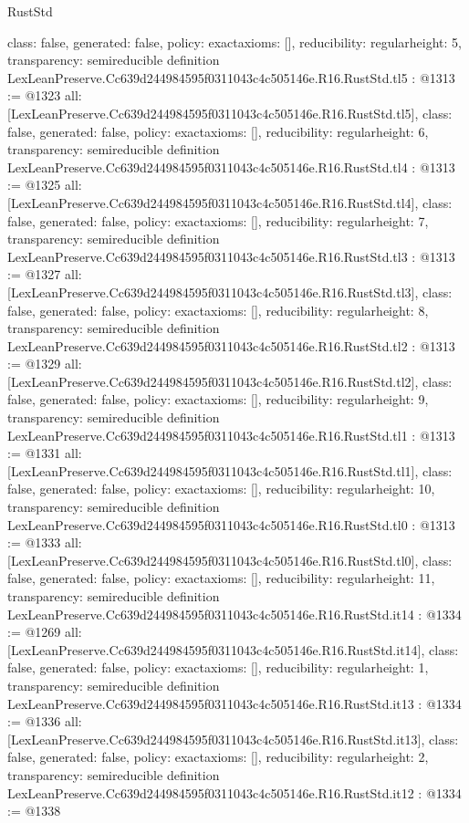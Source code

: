 \begin{lexlean}{RustStd}
\begin{coremodule}
{  class: false,
  generated: false,
  policy: exact{axioms: []},
  reducibility: regular{height: 5},
  transparency: semireducible
}
definition LexLeanPreserve.Cc639d244984595f0311043c4c505146e.R16.RustStd.tl5 : @1313 := @1323 {
  all: [LexLeanPreserve.Cc639d244984595f0311043c4c505146e.R16.RustStd.tl5],
  class: false,
  generated: false,
  policy: exact{axioms: []},
  reducibility: regular{height: 6},
  transparency: semireducible
}
definition LexLeanPreserve.Cc639d244984595f0311043c4c505146e.R16.RustStd.tl4 : @1313 := @1325 {
  all: [LexLeanPreserve.Cc639d244984595f0311043c4c505146e.R16.RustStd.tl4],
  class: false,
  generated: false,
  policy: exact{axioms: []},
  reducibility: regular{height: 7},
  transparency: semireducible
}
definition LexLeanPreserve.Cc639d244984595f0311043c4c505146e.R16.RustStd.tl3 : @1313 := @1327 {
  all: [LexLeanPreserve.Cc639d244984595f0311043c4c505146e.R16.RustStd.tl3],
  class: false,
  generated: false,
  policy: exact{axioms: []},
  reducibility: regular{height: 8},
  transparency: semireducible
}
definition LexLeanPreserve.Cc639d244984595f0311043c4c505146e.R16.RustStd.tl2 : @1313 := @1329 {
  all: [LexLeanPreserve.Cc639d244984595f0311043c4c505146e.R16.RustStd.tl2],
  class: false,
  generated: false,
  policy: exact{axioms: []},
  reducibility: regular{height: 9},
  transparency: semireducible
}
definition LexLeanPreserve.Cc639d244984595f0311043c4c505146e.R16.RustStd.tl1 : @1313 := @1331 {
  all: [LexLeanPreserve.Cc639d244984595f0311043c4c505146e.R16.RustStd.tl1],
  class: false,
  generated: false,
  policy: exact{axioms: []},
  reducibility: regular{height: 10},
  transparency: semireducible
}
definition LexLeanPreserve.Cc639d244984595f0311043c4c505146e.R16.RustStd.tl0 : @1313 := @1333 {
  all: [LexLeanPreserve.Cc639d244984595f0311043c4c505146e.R16.RustStd.tl0],
  class: false,
  generated: false,
  policy: exact{axioms: []},
  reducibility: regular{height: 11},
  transparency: semireducible
}
definition LexLeanPreserve.Cc639d244984595f0311043c4c505146e.R16.RustStd.it14 : @1334 := @1269 {
  all: [LexLeanPreserve.Cc639d244984595f0311043c4c505146e.R16.RustStd.it14],
  class: false,
  generated: false,
  policy: exact{axioms: []},
  reducibility: regular{height: 1},
  transparency: semireducible
}
definition LexLeanPreserve.Cc639d244984595f0311043c4c505146e.R16.RustStd.it13 : @1334 := @1336 {
  all: [LexLeanPreserve.Cc639d244984595f0311043c4c505146e.R16.RustStd.it13],
  class: false,
  generated: false,
  policy: exact{axioms: []},
  reducibility: regular{height: 2},
  transparency: semireducible
}
definition LexLeanPreserve.Cc639d244984595f0311043c4c505146e.R16.RustStd.it12 : @1334 := @1338 {
}
\end{coremodule}
\end{lexlean}
